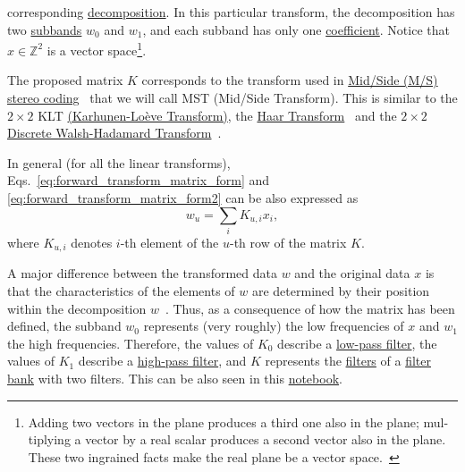 corresponding
\href{https://en.wikipedia.org/wiki/Discrete_wavelet_transform#Example_in_image_processing}{decomposition}. In
this particular transform, the decomposition has two
\href{https://en.wikipedia.org/wiki/Sub-band_coding}{subbands} $w_0$
and $w_1$, and each subband has only one
\href{https://web.stanford.edu/class/ee398a/handouts/lectures/07-TransformCoding.pdf}{coefficient}. Notice
that $x\in\mathbb{Z}^2$ is a vector space\footnote{Adding two vectors
  in the plane produces a third one also in the plane; mul- tiplying a
  vector by a real scalar produces a second vector also in the
  plane. These two ingrained facts make the real plane be a vector
  space.~\cite{vetterli2014foundations}}.

The proposed matrix $K$ corresponds to the transform used in
\href{https://en.wikipedia.org/wiki/Joint_encoding#M/S_stereo_coding}{Mid/Side
  (M/S) stereo coding}~\cite{bosi2003intro} that we will call MST
(Mid/Side Transform). This is similar to the $2\times 2$ KLT
\href{http://fourier.eng.hmc.edu/e161/lectures/klt/node3.html}{(Karhunen-Lo\`eve
  Transform)}, the
\href{http://wavelets.pybytes.com/wavelet/haar/}{Haar
  Transform}~\cite{vetterli1995wavelets} and the $2\times 2$
\href{https://en.wikipedia.org/wiki/Hadamard_transform}{Discrete
  Walsh-Hadamard Transform}~\cite{sayood2017introduction}.

In general (for all the linear transforms),
Eqs.~\ref{eq:forward_transform_matrix_form} and
\ref{eq:forward_transform_matrix_form2} can be also expressed as
\begin{equation}
  w_u = \sum_i K_{u,i}x_i,
  \label{eq:forward_transform_linear_combination_form}
\end{equation}
where $K_{u,i}$ denotes $i$-th element of the $u$-th row of the matrix
$K$.

A major difference between the transformed data $w$ and the original
data $x$ is that the characteristics of the elements of $w$ are
determined by their position within the decomposition
$w$~\cite{sayood2017introduction}. Thus, as a consequence of how the
matrix has been defined, the subband $w_0$ represents (very roughly)
the low frequencies of $x$ and $w_1$ the high frequencies. Therefore,
the values of $K_0$ describe a
\href{https://en.wikipedia.org/wiki/Low-pass_filter}{low-pass filter},
the values of $K_1$ describe a
\href{https://en.wikipedia.org/wiki/High-pass_filter}{high-pass
  filter}, and $K$ represents the
\href{https://en.wikipedia.org/wiki/Digital_filter}{filters} of a
\href{https://en.wikipedia.org/wiki/Filter_bank}{filter bank} with two
filters. This can be also seen in this
\href{https://github.com/Tecnologias-multimedia/intercom/blob/master/docs/stereo_transforms_RD.ipynb}{notebook}.

